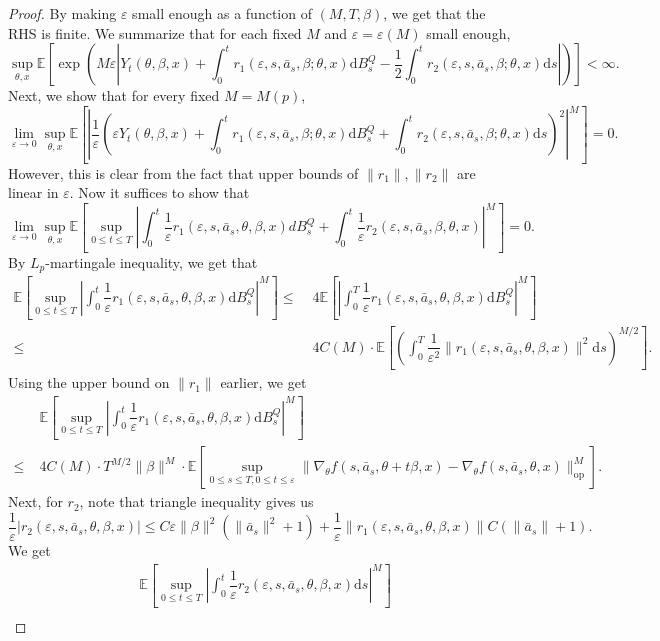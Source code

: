 \documentclass{article}
\newcommand{\eps}{\epsilon}
\newcommand{\1}{\mathbbm{1}}
\newcommand{\op}{\mathrm{op}}
\newcommand{\E}{\mathbb E}
\renewcommand{\H}{\mathcal{H}}
\numberwithin{equation}{section}
\def\to{\rightarrow}
\def\eps{\varepsilon}
\def\E{{\bf E}} \def\H{{\bf H}} \def\J{{\bf J}}
\def\d{{\mathrm{d}}}
\def\E{\mathbb{E}}
\begin{document}
\begin{proof}
By making $\eps$ small enough as a function of $(M, T, \beta)$, we get that the RHS is finite. We summarize that for each fixed $M$ and $\eps=\eps(M)$ small enough,
$$\sup_{\theta, x}\E\left[\exp\left(M\eps \left|Y_{t}(\theta, \beta, x)+\int_{0}^{t}r_{1}(\eps, s, \bar a_{s}, \beta;\theta, x)\d B_{s}^{Q}-\frac12\int_{0}^{t}r_{2}(\eps, s, \bar a_{s},\beta; \theta, x)\d s\right|\right)\right]<\infty.$$
Next, we show that for every fixed $M=M(p)$, 
$$\lim_{\eps\to 0}\sup_{\theta, x}\E\left[\left|\dfrac{1}{\eps}\left(\eps Y_{t}(\theta, \beta, x)+\int_{0}^{t}r_{1}(\eps, s, \bar a_{s}, \beta;\theta, x)\d B_{s}^{Q}+\int_{0}^{t}r_{2}(\eps, s, \bar a_{s},\beta; \theta, x)\d s\right)^{2}\right|^{M}\right]=0.$$
However, this is clear from the fact that upper bounds of $\|r_{1}\|, \|r_{2}\|$ are linear in $\eps$. Now it suffices to show that
$$\lim_{\eps\to 0}\sup_{\theta, x}\E\left[\sup_{0\leq t\leq T}\left|\int_{0}^{t}\dfrac{1}{\eps}r_{1}(\eps, s, \bar a_{s}, \theta, \beta, x)dB_{s}^{Q}+\int_{0}^{t}\dfrac{1}{\eps}r_{2}(\eps, s, \bar a_{s}, \beta, \theta, x)\right|^{M}\right]=0.$$
By $L_{p}$-martingale inequality, we get that
\begin{align*}
\E\left[\sup_{0\leq t\leq T}\left|\int_{0}^{t}\dfrac{1}{\eps}r_{1}(\eps, s, \bar a_{s}, \theta, \beta, x)\d B_{s}^{Q}\right|^{M}\right]\leq\;& 4\E\left[\left|\int_{0}^{T}\dfrac{1}{\eps}r_{1}(\eps, s, \bar a_{s}, \theta, \beta, x)\d B_{s}^{Q}\right|^{M}\right]\\
\leq\;&4C(M)\cdot \E\left[\left(\int_{0}^{T}\dfrac{1}{\eps^{2}}\|r_{1}(\eps, s, \bar a_{s}, \theta, \beta, x)\|^{2}\d s\right)^{M/2}\right].
\end{align*}
Using the upper bound on $\|r_{1}\|$ earlier, we get
\begin{align*}
&\E\left[\sup_{0\leq t\leq T}\left|\int_{0}^{t}\dfrac{1}{\eps}r_{1}(\eps, s, \bar a_{s}, \theta, \beta, x)\d B_{s}^{Q}\right|^{M}\right]\\
\leq\;& 4C(M)\cdot T^{M/2}\|\beta\|^{M}\cdot \E\left[\sup_{0\leq s\leq T, 0\leq t\leq \eps}\|\nabla_{\theta} f(s, \bar a_{s}, \theta+t\beta, x)-\nabla_{\theta} f(s, \bar a_{s}, \theta, x)\|_{\op}^{M}\right].
\end{align*}
Next, for $r_{2}$, note that triangle inequality gives us
$$\dfrac{1}{\eps}|r_{2}(\eps, s, \bar a_{s}, \theta, \beta, x)|\leq C\eps\|\beta\|^{2}(\|\bar a_{s}\|^{2}+1)+\dfrac{1}{\eps}\left\|r_{1}(\eps, s, \bar a_{s}, \theta, \beta, x)\right\|C(\|\bar a_{s}\|+1).$$
We get
\begin{align*}
&\E\left[\sup_{0\leq t\leq T}\left|\int_{0}^{t}\dfrac{1}{\eps}r_{2}(\eps, s, \bar a_{s}, \theta, \beta, x)\d s\right|^{M}\right]\\

\end{align*}
\end{proof}
\end{document}

